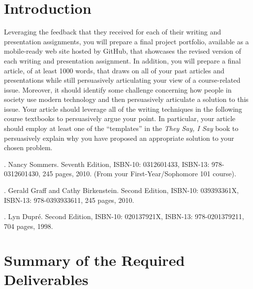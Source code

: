 

\usepackage[compact]{titlesec}




\vspace*{-.2in}
\section*{Introduction}

Leveraging the feedback that they received for each of their writing and presentation assignments, you will prepare a
final project portfolio, available as a mobile-ready web site hosted by GitHub, that showcases the revised version of
each writing and presentation assignment. In addition, you will prepare a final article, of at least 1000 words, that
draws on all of your past articles and presentations while still persuasively articulating your view of a course-related
issue. Moreover, it should identify some challenge concerning how people in society use modern technology and then
persuasively articulate a solution to this issue. Your article should leverage all of the writing techniques in the
following course textbooks to persuasively argue your point. In particular, your article should employ at least one of
the ``templates'' in the {\em They Say, I Say} book to persuasively explain why you have proposed an appropriate
solution to your chosen problem.

. Nancy Sommers. Seventh Edition, ISBN-10: 0312601433, ISBN-13: 978-0312601430,
245 pages, 2010. (From your First-Year/Sophomore 101 course).

. Gerald Graff and Cathy Birkenstein. Second Edition,
ISBN-10: 039393361X, ISBN-13: 978-0393933611, 245 pages, 2010.

. Lyn Dupr\'e. Second Edition, ISBN-10: 020137921X,
ISBN-13: 978-0201379211, 704 pages, 1998.

\section*{Summary of the Required Deliverables}

